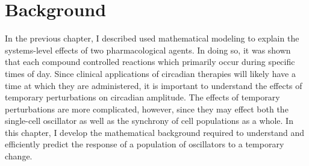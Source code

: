
\section{Background}

In the previous chapter, I described used mathematical modeling to explain the systems-level effects of two pharmacological agents. 
In doing so, it was shown that each compound controlled reactions which primarily occur during specific times of day. 
Since clinical applications of circadian therapies will likely have a time at which they are administered, it is important to understand the effects of temporary perturbations on circadian amplitude. 
The effects of temporary perturbations are more complicated, however, since they may effect both the single-cell oscillator as well as the synchrony of cell populations as a whole.
In this chapter, I develop the mathematical background required to understand and efficiently predict the response of a population of oscillators to a temporary change.

